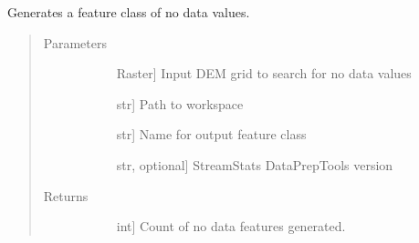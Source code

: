 \documentclass[letterpaper,10pt,english]{sphinxmanual}
\begin{document}
\begin{fulllineitems}
\label{\detokenize{elevationTools:elevationTools.checkNoData}}
Generates a feature class of no data values.
\begin{quote}\begin{description}
\item[{Parameters}] \leavevmode\begin{description}
\item[{}] \leavevmode{[}Raster{]}
Input DEM grid to search for no data values

\item[{}] \leavevmode{[}str{]}
Path to workspace

\item[{}] \leavevmode{[}str{]}
Name for output feature class

\item[{}] \leavevmode{[}str, optional{]}
StreamStats DataPrepTools version

\end{description}

\item[{Returns}] \leavevmode\begin{description}
\item[{}] \leavevmode{[}int{]}
Count of no data features generated.

\end{description}

\end{description}\end{quote}

\end{fulllineitems}

\end{document}
